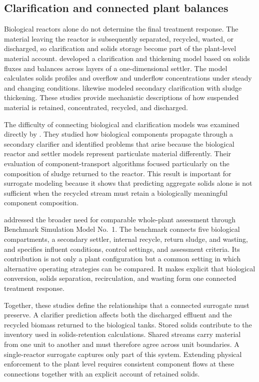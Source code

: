 \subsection{Clarification and connected plant balances}

Biological reactors alone do not determine the final treatment response. The material leaving the reactor is subsequently separated, recycled, wasted, or discharged, so clarification and solids storage become part of the plant-level material account. \citet{Takacs1991} developed a clarification and thickening model based on solids fluxes and balances across layers of a one-dimensional settler. The model calculates solids profiles and overflow and underflow concentrations under steady and changing conditions. \citet{HartelPopel1992} likewise modeled secondary clarification with sludge thickening. These studies provide mechanistic descriptions of how suspended material is retained, concentrated, recycled, and discharged.

The difficulty of connecting biological and clarification models was examined directly by \citet{JeppssonDiehl1996}. They studied how biological components propagate through a secondary clarifier and identified problems that arise because the biological reactor and settler models represent particulate material differently. Their evaluation of component-transport algorithms focused particularly on the composition of sludge returned to the reactor. This result is important for surrogate modeling because it shows that predicting aggregate solids alone is not sufficient when the recycled stream must retain a biologically meaningful component composition.

\citet{Alex2008} addressed the broader need for comparable whole-plant assessment through Benchmark Simulation Model No.\ 1. The benchmark connects five biological compartments, a secondary settler, internal recycle, return sludge, and wasting, and specifies influent conditions, control settings, and assessment criteria. Its contribution is not only a plant configuration but a common setting in which alternative operating strategies can be compared. It makes explicit that biological conversion, solids separation, recirculation, and wasting form one connected treatment response.

Together, these studies define the relationships that a connected surrogate must preserve. A clarifier prediction affects both the discharged effluent and the recycled biomass returned to the biological tanks. Stored solids contribute to the inventory used in solids-retention calculations. Shared streams carry material from one unit to another and must therefore agree across unit boundaries. A single-reactor surrogate captures only part of this system. Extending physical enforcement to the plant level requires consistent component flows at these connections together with an explicit account of retained solids.

